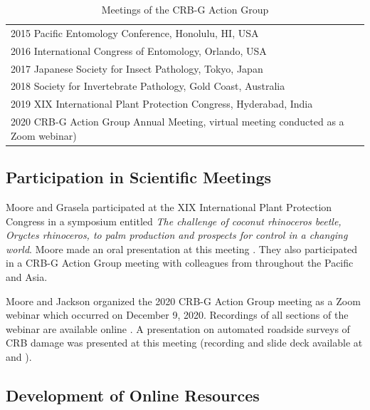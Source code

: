 \documentclass[12pt,letterpaper,english,bibliography=totocnumbered,abstract=on]{scrartcl}
\begin{document}
\begin{table}[h]
	\centering
	\caption{Meetings of the CRB-G Action Group}
	\begin{tabular}{l}
		\toprule
		2015 Pacific Entomology Conference, Honolulu, HI, USA \\
		2016 International Congress of Entomology, Orlando, USA \\
		2017 Japanese Society for Insect Pathology, Tokyo, Japan \\
		2018 Society for Invertebrate Pathology, Gold Coast, Australia \\
		2019 XIX International Plant Protection Congress, Hyderabad, India \\
		2020 CRB-G Action Group Annual Meeting, virtual meeting conducted as a Zoom webinar) \\
		\bottomrule
	\end{tabular}
	\label{tab:action-group}
\end{table}	

\subsection{Participation in Scientific Meetings}

Moore and Grasela participated at the XIX International Plant Protection Congress in a symposium entitled \textit{The challenge of coconut rhinoceros beetle, Oryctes rhinoceros, to palm production and prospects for control in a changing world}. Moore made an oral presentation at this meeting \parencite{moore_status_2019}.
They also participated in a CRB-G Action Group meeting with colleagues from throughout the Pacific and Asia.

Moore and Jackson organized the 2020 CRB-G Action Group meeting as a Zoom webinar which occurred on December 9, 2020. Recordings of all sections of the webinar are available online \cite{mooreVideoRecordingCRBG2020}. A presentation on automated roadside surveys of CRB damage was presented at this meeting (recording and slide deck available at \cite{mooreVideoRecordingCRBG2020} and \cite{mooreAutomatedRoadsideVideo2020}).

\subsection{Development of Online Resources}
\end{document}

